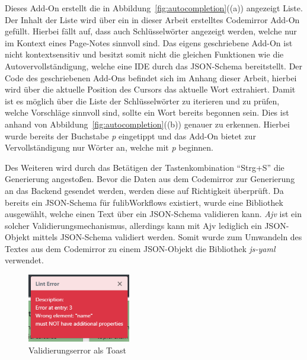 Dieses Add-On erstellt die in Abbildung~\ref{fig:autocompletion}((a)) angezeigt Liste.
Der Inhalt der Liste wird über ein in dieser Arbeit erstelltes Codemirror Add-On gefüllt.
Hierbei fällt auf, dass auch Schlüsselwörter angezeigt werden, welche nur im Kontext eines Page-Notes sinnvoll sind.
Das eigens geschriebene Add-On ist nicht kontextsensitiv und besitzt somit nicht die gleichen Funktionen wie die Autovervollständigung, welche eine \ac{IDE} durch das JSON-Schema bereitstellt.
Der Code des geschriebenen Add-Ons befindet sich im Anhang dieser Arbeit, hierbei wird über die aktuelle Position des Cursors das aktuelle Wort extrahiert.
Damit ist es möglich über die Liste der Schlüsselwörter zu iterieren und zu prüfen, welche Vorschläge sinnvoll sind, sollte ein Wort bereits begonnen sein.
Dies ist anhand von Abbildung~\ref{fig:autocompletion}((b)) genauer zu erkennen.
Hierbei wurde bereits der Buchstabe \textit{p} eingetippt und das Add-On bietet zur Vervollständigung nur Wörter an, welche mit \textit{p} beginnen.

Des Weiteren wird durch das Betätigen der Tastenkombination ``Strg+S'' die Generierung angestoßen.
Bevor die Daten aus dem Codemirror zur Generierung an das Backend gesendet werden, werden diese auf Richtigkeit überprüft.
Da bereits ein JSON-Schema für fulibWorkflows existiert, wurde eine Bibliothek ausgewählt, welche einen Text über ein JSON-Schema validieren kann.
\textit{Ajv} ist ein solcher Validierungsmechanismus, allerdings kann mit Ajv lediglich ein JSON-Objekt mittels JSON-Schema validiert werden\cite*{ajv}.
Somit wurde zum Umwandeln des Textes aus dem Codemirror zu einem JSON-Objekt die Bibliothek \textit{js-yaml} verwendet\cite*{js-yaml}.

\begin{figure}[h]
    \centering
    \includegraphics[width=0.4\textwidth]{images/3.2/error-toast}
    \caption{Validierungserror als Toast}
    \label{fig:error-toast}
\end{figure}

